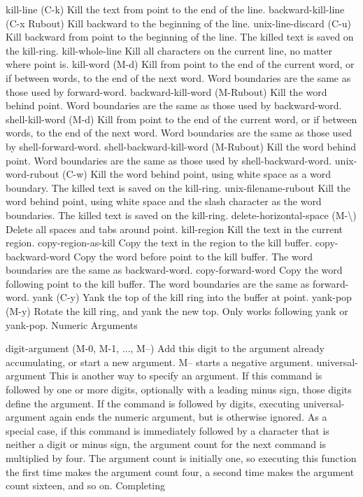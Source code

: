 kill-line (C-k)
Kill the text from point to the end of the line.
backward-kill-line (C-x Rubout)
Kill backward to the beginning of the line.
unix-line-discard (C-u)
Kill backward from point to the beginning of the line. The killed text is saved on the kill-ring.
kill-whole-line
Kill all characters on the current line, no matter where point is.
kill-word (M-d)
Kill from point to the end of the current word, or if between words, to the end of the next word. Word boundaries are the same as those used by forward-word.
backward-kill-word (M-Rubout)
Kill the word behind point. Word boundaries are the same as those used by backward-word.
shell-kill-word (M-d)
Kill from point to the end of the current word, or if between words, to the end of the next word. Word boundaries are the same as those used by shell-forward-word.
shell-backward-kill-word (M-Rubout)
Kill the word behind point. Word boundaries are the same as those used by shell-backward-word.
unix-word-rubout (C-w)
Kill the word behind point, using white space as a word boundary. The killed text is saved on the kill-ring.
unix-filename-rubout
Kill the word behind point, using white space and the slash character as the word boundaries. The killed text is saved on the kill-ring.
delete-horizontal-space (M-\textbackslash)
Delete all spaces and tabs around point.
kill-region
Kill the text in the current region.
copy-region-as-kill
Copy the text in the region to the kill buffer.
copy-backward-word
Copy the word before point to the kill buffer. The word boundaries are the same as backward-word.
copy-forward-word
Copy the word following point to the kill buffer. The word boundaries are the same as forward-word.
yank (C-y)
Yank the top of the kill ring into the buffer at point.
yank-pop (M-y)
Rotate the kill ring, and yank the new top. Only works following yank or yank-pop.
Numeric Arguments

digit-argument (M-0, M-1, ..., M--)
Add this digit to the argument already accumulating, or start a new argument. M-- starts a negative argument.
universal-argument
This is another way to specify an argument. If this command is followed by one or more digits, optionally with a leading minus sign, those digits define the argument. If the command is followed by digits, executing universal-argument again ends the numeric argument, but is otherwise ignored. As a special case, if this command is immediately followed by a character that is neither a digit or minus sign, the argument count for the next command is multiplied by four. The argument count is initially one, so executing this function the first time makes the argument count four, a second time makes the argument count sixteen, and so on.
Completing

